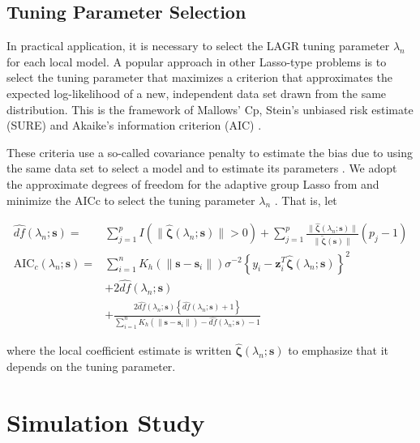 \documentclass[12pt,english,authoryear, review]{article}\usepackage[]{graphicx}\usepackage[]{color}
\makeatletter
\newenvironment{kframe}{%
 \def\at@end@of@kframe{}%
 \ifinner\ifhmode%
  \def\at@end@of@kframe{\end{minipage}}%
  \begin{minipage}{\columnwidth}%
 \fi\fi%
 \def\FrameCommand##1{\hskip\@totalleftmargin \hskip-\fboxsep
 \colorbox{shadecolor}{##1}\hskip-\fboxsep
     \hskip-\linewidth \hskip-\@totalleftmargin \hskip\columnwidth}%
 \MakeFramed {\advance\hsize-\width
   \@totalleftmargin\z@ \linewidth\hsize
   \@setminipage}}%
 {\par\unskip\endMakeFramed%
 \at@end@of@kframe}
\newenvironment{knitrout}{}{} %
\theoremstyle{plain}
\theoremstyle{plain}
\makeatother
\begin{document}
\subsection{Tuning Parameter Selection}

In practical application, it is necessary to select the LAGR tuning
parameter $\lambda_{n}$ for each local model. A popular approach
in other Lasso-type problems is to select the tuning parameter that
maximizes a criterion that approximates the expected log-likelihood
of a new, independent data set drawn from the same distribution. This
is the framework of Mallows' Cp, Stein's unbiased risk estimate (SURE)
and Akaike's information criterion (AIC) \citep{Mallows-1973,Stein-1981,Akaike-1973}.

These criteria use a so-called covariance penalty to estimate the
bias due to using the same data set to select a model and to estimate
its parameters \citep{Efron:2004a}. We adopt the approximate degrees
of freedom for the adaptive group Lasso from \citet{Yuan-Lin-2006}
and minimize the AICc to select the tuning parameter $\lambda_{n}$
\citep{Hurvich-1998}. That is, let

\begin{align*}
\hat{df}(\lambda_{n};\bm{s})= & \sum_{j=1}^{p}I\left(\|\hat{\bm{\zeta}}(\lambda_{n};\bm{s})\|>0\right)+\sum_{j=1}^{p}\frac{\|\hat{\bm{\zeta}}(\lambda_{n};\bm{s})\|}{\|\tilde{\bm{\zeta}}(\bm{s})\|}(p_{j}-1)\\
\text{AIC}_{c}(\lambda_{n};\bm{s})= & \sum_{i=1}^{n}K_{h}(\|\bm{s}-\bm{s}_{i}\|)\sigma^{-2}\left\{ y_{i}-\bm{z}_{i}^{T}\hat{\bm{\zeta}}(\lambda_{n};\bm{s})\right\} ^{2}\\
 & +2\hat{df}(\lambda_{n};\bm{s})\\
 & +\frac{2\hat{df}(\lambda_{n};\bm{s})\left\{ \hat{df}(\lambda_{n};\bm{s})+1\right\} }{\sum_{i=1}^{n}K_{h}(\|\bm{s}-\bm{s}_{i}\|)-\hat{df}(\lambda_{n};\bm{s})-1}
\end{align*}


where the local coefficient estimate is written $\hat{\bm{\zeta}}(\lambda_{n};\bm{s})$
to emphasize that it depends on the tuning parameter.


\section{Simulation Study\label{sec:simulations}}

\begin{knitrout}
\color{fgcolor}\begin{kframe}


{\ttfamily\noindent\bfseries\color{errorcolor}{\#\# Error: cannot open the connection}}\end{kframe}
\end{knitrout}
\end{document}

